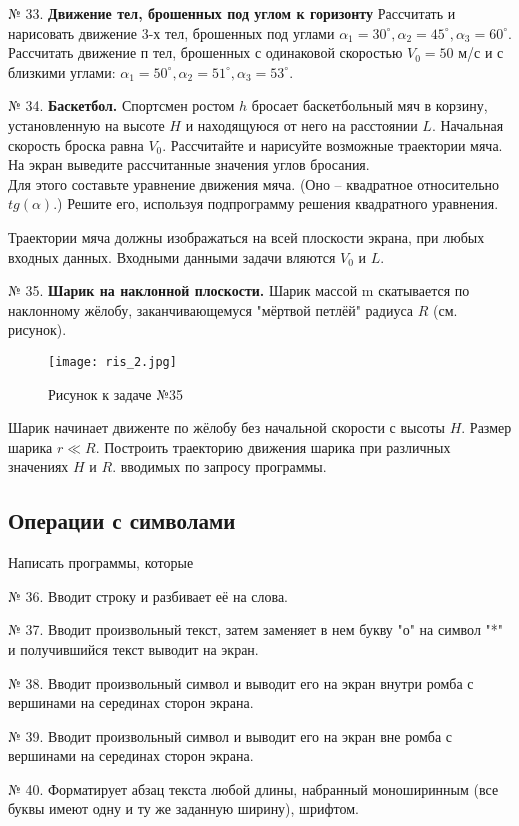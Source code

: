 {№ 33. {\bf Движение тел, брошенных под углом к горизонту} Рассчитать и нарисовать движение 3-х тел, брошенных под углами $\alpha_1 =30^\circ, \alpha_2 = 45^\circ, \alpha_3 =60^\circ$.  Рассчитать движение $п$ тел, брошенных с одинаковой скоростью   $V_0=50$ м/с  и с близкими углами: $\alpha_1 = 50^\circ, \alpha_2 = 51^\circ, \alpha_3 = 53^\circ$.

№ 34. {\bf Баскетбол.}
Спортсмен ростом $h$ бросает баскетбольный мяч в корзину, установленную на высоте $H$ и находящуюся от него на расстоянии $L$. Начальная скорость броска равна $V_0$. Рассчитайте и нарисуйте возможные траектории мяча. На экран выведите рассчитанные значения углов бросания.\\
Для этого составьте уравнение движения мяча. (Оно -- квадратное относительно $tg(\alpha)$.)  Решите его, используя подпрограмму решения квадратного уравнения.

Траектории мяча должны изображаться на всей плоскости экрана, при любых входных данных. Входными данными задачи  вляются  $V_0$ и $L$.

№ 35. {\bf Шарик на наклонной плоскости.}
Шарик массой m скатывается по наклонному жёлобу, заканчивающемуся "мёртвой петлёй" радиуса $R$ (см. рисунок). 
\begin{figure}[!hb]
\centerline{
\texttt{[image: ris\_2.jpg]}}
\caption{Рисунок к задаче №35}
\end{figure}
Шарик начинает движенте по жёлобу без начальной скорости с высоты $H$. Размер шарика $r \ll R$. Построить траекторию движения шарика при различных значениях $H$ и $R$. вводимых по запросу программы.

\subsection{Операции с символами}

Написать программы, которые

№ 36. Вводит строку и разбивает её на слова.

№ 37. Вводит произвольный текст, затем заменяет в нем букву "о" на   символ "*" и получившийся текст выводит на экран.

№ 38. Вводит произвольный символ и выводит его на экран внутри ромба с вершинами на серединах сторон экрана.

№ 39. Вводит произвольный символ и выводит его на экран вне ромба с вершинами на серединах сторон экрана.

№ 40. Форматирует абзац текста любой длины, набранный моноширинным (все буквы имеют одну и ту же заданную ширину), шрифтом.

}
